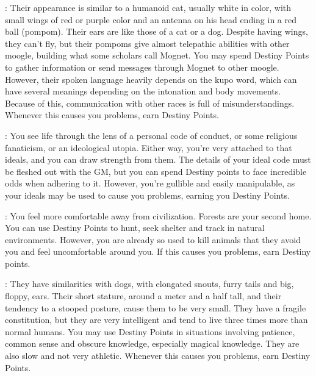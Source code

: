 \begin{multicols}{2}
\begin{ffcolpage}
\end{ffcolpage} \pw \begin{minipage}{.35\textwidth-2\columnsep}
: Their appearance is similar to a humanoid cat, usually white in color, with small wings of red or purple color and an antenna on his head ending in a red ball (pompom). Their ears are like those of a cat or a dog. Despite having wings, they can't fly, but their pompoms give almost telepathic abilities with other moogle, building what some scholars call Mognet. You may spend Destiny Points to gather information or send messages through Mognet to other moogle. However, their spoken language heavily depends on the kupo word, which can have several meanings depending on the intonation and body movements. Because of this, communication with other races is full of misunderstandings. Whenever this causes you problems, earn Destiny Points.
\end{minipage} \pw \begin{ffcolpage}
: You see life through the lens of a personal code of conduct, or some religious fanaticism, or an ideological utopia. Either way, you're very attached to that ideals, and you can draw strength from them. The details of your ideal code must be fleshed out with the GM, but you can spend Destiny points to face incredible odds when adhering to it. However, you're gullible and easily manipulable, as your ideals may be used to cause you problems, earning you Destiny Points.
\end{ffcolpage} \pw \begin{ffcolpage}
: You feel more comfortable away from civilization. Forests are your second home. You can use Destiny Points to hunt, seek shelter and track in natural environments. However, you are already so used to kill animals that they avoid you and feel uncomfortable around you. If this causes you problems, earn Destiny points.
\end{ffcolpage} \pw \begin{ffcolpage}
: They have similarities with dogs, with elongated snouts, furry tails and big, floppy, ears. Their short stature, around a meter and a half tall, and their tendency to a stooped posture, cause them to be very small. They have a fragile constitution, but they are very intelligent and tend to live three times more than normal humans. You may use Destiny Points in situations involving patience, common sense and obscure knowledge, especially magical knowledge. They are also slow and not very athletic. Whenever this causes you problems, earn Destiny Points.

\end{ffcolpage}
\end{multicols}
